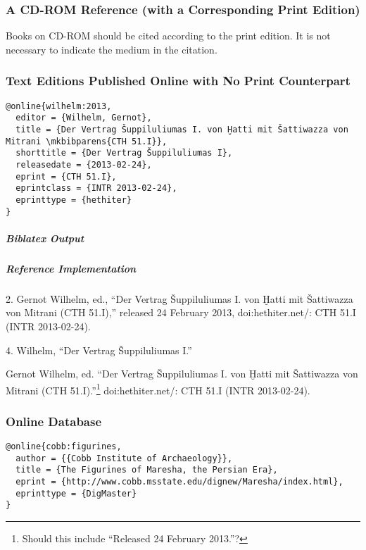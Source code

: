 \documentclass[a4paper]{article}
\newenvironment{biboutput}{%
  \subparagraph{Biblatex Output}
}{\color{black}}
\newenvironment{refimp}{%
  \subparagraph{Reference Implementation}
  \color{reference-colour}
  \rm
}{\par\color{black}}
\begin{document}
\subsubsection{A CD-ROM Reference (with a Corresponding Print Edition)}

Books on CD-ROM should be cited according to the print edition. It is not
necessary to indicate the medium in the citation.

\subsubsection{Text Editions Published Online with No Print Counterpart}

\begin{lstlisting}
@online{wilhelm:2013,
  editor = {Wilhelm, Gernot},
  title = {Der Vertrag Šuppiluliumas I. von Ḫatti mit Šattiwazza von Mitrani \mkbibparens{CTH 51.I}},
  shorttitle = {Der Vertrag Šuppiluliumas I},
  releasedate = {2013-02-24},
  eprint = {CTH 51.I},
  eprintclass = {INTR 2013-02-24},
  eprinttype = {hethiter}
}
\end{lstlisting}

\begin{biboutput}
\end{biboutput}

\begin{refimp}
  2. Gernot Wilhelm, ed., “Der Vertrag Šuppiluliumas I. von Ḫatti mit
  Šattiwazza von Mitrani (CTH 51.I),” released 24 February 2013,
  doi:hethiter.net/: CTH 51.I (INTR 2013-02-24).

  4. Wilhelm, “Der Vertrag Šuppiluliumas I.”

  \hangindent\bibindent Gernot Wilhelm, ed. “Der Vertrag Šuppiluliumas I. von
  Ḫatti mit Šattiwazza von Mitrani (CTH 51.I).”\footnote{Should this include
  “Released 24 February 2013.”?} doi:hethiter.net/: CTH 51.I
  (INTR 2013-02-24).
\end{refimp}

\subsubsection{Online Database}

\begin{lstlisting}
@online{cobb:figurines,
  author = {{Cobb Institute of Archaeology}},
  title = {The Figurines of Maresha, the Persian Era},
  eprint = {http://www.cobb.msstate.edu/dignew/Maresha/index.html},
  eprinttype = {DigMaster}
}
\end{lstlisting}
\end{document}
